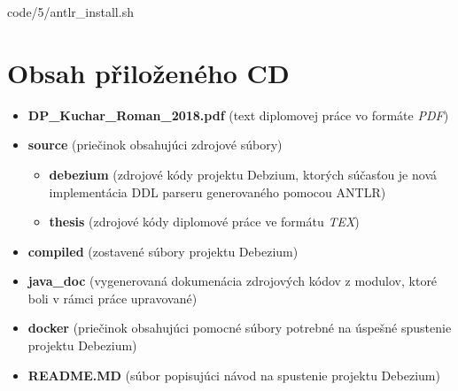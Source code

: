 
            {code/5/antlr_install.sh}


\chapter{Obsah přiloženého CD}
\begin{itemize}
   \item{\textbf{DP\_Kuchar\_Roman\_2018.pdf}} (text diplomovej práce vo formáte \textit{PDF})
   \item{\textbf{source}} (priečinok obsahujúci zdrojové súbory)
      \begin{itemize}
         \item{\textbf{debezium}} (zdrojové kódy projektu Debzium, ktorých súčasťou je nová implementácia DDL parseru generovaného pomocou ANTLR)
         \item{\textbf{thesis}} (zdrojové kódy diplomové práce ve formátu \textit{TEX})
      \end{itemize}
   \item{\textbf{compiled}} (zostavené súbory projektu Debezium)
   \item{\textbf{java\_doc}} (vygenerovaná dokumenácia zdrojových kódov z modulov, ktoré boli v rámci práce upravované)
   \item{\textbf{docker}} (priečinok obsahujúci pomocné súbory potrebné na úspešné spustenie projektu Debezium)
   \item{\textbf{README.MD}} (súbor popisujúci návod na spustenie projektu Debezium)
\end{itemize}
